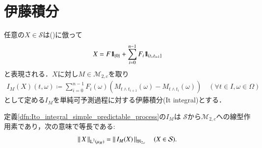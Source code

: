 \section{伊藤積分}
	
	\begin{screen}
		\begin{dfn}[単純可予測過程に対する伊藤積分]
			任意の$X \in \mathcal{S}$は()に倣って
			\begin{align}
				X = F \mbox{1}\hspace{-0.25em}\mbox{l}_{\{0\}} + \sum_{i=0}^{n-1} F_i \mbox{1}\hspace{-0.25em}\mbox{l}_{\left(t_i,t_{i+1}\right]}
				\label{eq:dfn_Ito_integral_simple_predictable_process}
			\end{align}
			と表現される．$X$に対し$M \in \mathcal{M}_{2,c}$を取り
			\begin{align}
				I_M(X)(t,\omega) \coloneqq \sum_{i=0}^{n-1} F_i(\omega) \left(M_{t \wedge t_{i+1}}(\omega) - M_{t \wedge t_i}(\omega)\right)
				\quad (\forall t \in I,\omega \in \Omega)
			\end{align}
			として定める$I_M$を単純可予測過程に対する伊藤積分(It integral)とする．
			\label{dfn:Ito_integral_simple_predictable_process}
		\end{dfn}
	\end{screen}
	
	\begin{screen}
		\begin{thm}[伊藤積分の連続線型性]
			定義\ref{dfn:Ito_integral_simple_predictable_process}の$I_M$は
			$\mathcal{S}$から$\mathcal{M}_{2,c}$への線型作用素であり，次の意味で等長である:
			\begin{align}
				\left\|\, X\, \right\|_{\operatorname{L}^{2} \left(\mu_M\right)} = \left\|\, I_M(X)\, \right\|_{\mathfrak{M}_{2,c}}
				\quad (X \in \mathcal{S}).
			\end{align}
		\end{thm}
	\end{screen}
	
